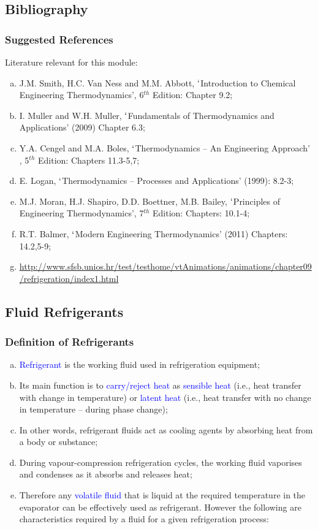 \documentclass[10pt,compress]{beamer}
\begin{document}
\subsection{Bibliography} 
\begin{frame}
 \frametitle{Suggested References}
  Literature relevant for this module:
  \begin{enumerate}[(a)]
   \item J.M. Smith, H.C. Van Ness and M.M. Abbott, $\lq$Introduction to Chemical Engineering Thermodynamics', 6$^{th}$ Edition: Chapter 9.2;
   \item I. Muller and W.H. Muller, $\lq$Fundamentals of Thermodynamics and Applications' (2009) Chapter 6.3;
   \item Y.A. Cengel and M.A. Boles, $\lq$Thermodynamics -- An Engineering Approach' , 5$^{th}$ Edition: Chapters 11.3-5,7;
   \item E. Logan, $\lq$Thermodynamics -- Processes and Applications' (1999): 8.2-3;
   \item M.J. Moran, H.J. Shapiro, D.D. Boettner, M.B. Bailey, $\lq$Principles of Engineering Thermodynamics', 7$^{th}$ Edition: Chapters: 10.1-4;
   \item R.T. Balmer, $\lq$Modern Engineering Thermodynamics' (2011) Chapters: 14.2,5-9;
   \item \href{http://www.sfsb.unios.hr/test/testhome/vtAnimations/animations/chapter09/refrigeration/index1.html}{\tiny{http://www.sfsb.unios.hr/test/testhome/vtAnimations/animations/chapter09/refrigeration/index1.html}}
  \end{enumerate}
\end{frame}


\subsection{Fluid Refrigerants}
\begin{frame}
 \frametitle{Definition of Refrigerants}
  \begin{enumerate}[(a)]
   \item <1-> \textcolor{blue}{Refrigerant} is the working fluid used in refrigeration equipment; 
   \item <2-> Its main function is to \textcolor{blue}{carry/reject heat} as \textcolor{blue}{sensible heat} (i.e., heat transfer with change in temperature) or \textcolor{blue}{latent heat} (i.e., heat transfer with no change in temperature -- during phase change);
   \item <3-> In other words, refrigerant fluids act as cooling agents by absorbing heat from a body or substance;
   \item <4-> During vapour-compression refrigeration cycles, the working fluid vaporises and condenses as it absorbs and releases heat;
   \item <5-> Therefore any \textcolor{blue}{volatile fluid} that is liquid at the required temperature in the evaporator can be effectively used as refrigerant. However the following are characteristics required by a fluid for a given refrigeration process:
  \end{enumerate}
\end{frame}
\end{document}
